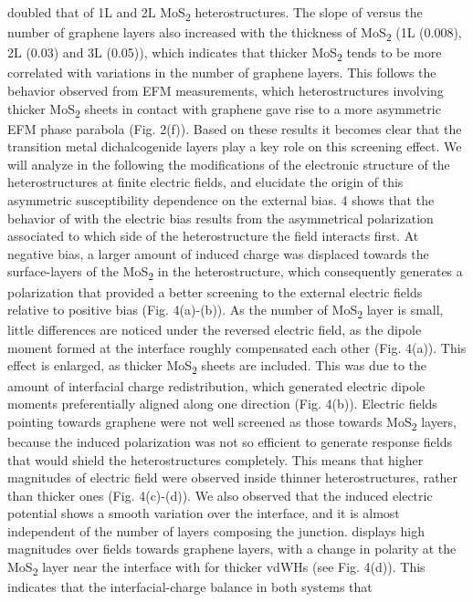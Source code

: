 doubled that of 1L and 2L MoS\textsubscript{2} heterostructures. The slope of versus
the number of graphene layers also increased with the thickness of
MoS\textsubscript{2} (1L (0.008), 2L (0.03) and 3L (0.05)), which indicates that
thicker MoS\textsubscript{2} tends to be more correlated with variations in the number
of graphene layers. This follows the behavior observed from EFM
measurements, which heterostructures involving thicker MoS\textsubscript{2} sheets in
contact with graphene gave rise to a more asymmetric EFM phase
parabola (Fig. 2(f)). Based on these results it becomes clear that the
transition metal dichalcogenide layers play a key role on this
screening effect. We will analyze in the following the modifications
of the electronic structure of the heterostructures at finite electric
fields, and elucidate the origin of this asymmetric susceptibility
dependence on the external bias.   4 shows that the behavior of
with the electric bias results from the asymmetrical polarization
associated to which side of the heterostructure the field interacts
first. At negative bias, a larger amount of induced charge was
displaced towards the surface-layers of the MoS\textsubscript{2} in the
heterostructure, which consequently generates a polarization that
provided a better screening to the external electric fields relative
to positive bias (Fig. 4(a)-(b)). As the number of MoS\textsubscript{2} layer is
small, little differences are noticed under the reversed electric
field, as the dipole moment formed at the interface roughly
compensated each other (Fig. 4(a)).  This effect is enlarged, as
thicker MoS\textsubscript{2} sheets are included. This was due to the amount of
interfacial charge redistribution, which generated electric dipole
moments preferentially aligned along one direction
(Fig. 4(b)). Electric fields pointing towards graphene were not well
screened as those towards MoS\textsubscript{2} layers, because the induced
polarization was not so efficient to generate response fields that
would shield the heterostructures completely. This means that higher
magnitudes of electric field were observed inside thinner
heterostructures, rather than thicker ones (Fig. 4(c)-(d)). We also
observed that the induced electric potential shows a smooth variation
over the interface, and it is almost independent of the number of
layers composing the junction.  displays high magnitudes over fields
towards graphene layers, with a change in polarity at the MoS\textsubscript{2} layer
near the interface with for thicker vdWHs (see Fig. 4(d)). This
indicates that the interfacial-charge balance in both systems that
